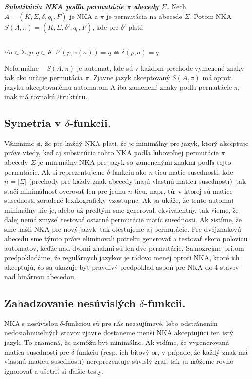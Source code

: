 \begin{defn}{\textbf {\textit {Substitúcia NKA podľa permutácie $\pi$ abecedy $\Sigma$.}}} Nech $A = (K,\Sigma,\delta,q_0,F)$ je NKA a $\pi$ je permutácia na abecede $\Sigma$. Potom NKA $S(A,\pi)=(K,\Sigma,\delta',q_0,F)$, kde pre $\delta'$ platí:
\\
\\
\centerline{$\forall a\in \Sigma, p,q \in K: \delta'(p,\pi(a)) = q \Longleftrightarrow \delta(p,a) = q$}
\end{defn}
Neformálne -- $S(A,\pi)$ je  automat, kde sú v každom prechode vymenené znaky tak ako určuje permutácia $\pi$. Zjavne jazyk akceptovaný $S(A,\pi)$ má oproti jazyku akceptovanému automatom A iba zamenené znaky podľa permutácie $\pi$, inak má rovnakú štruktúru.


\subsection{Symetria v $\delta$-funkcii.} Všimnime si, že pre každý NKA platí, že je minimálny pre jazyk, ktorý akceptuje práve vtedy, keď aj substitúcia tohto NKA podľa ľubovoľnej permutácie $\pi$ abecedy $\Sigma$ je minimálny NKA pre jazyk so zamenenými znakmi podľa tejto permutácie. Ak si reprezentujeme $\delta$-funkciu ako $n$-ticu matíc susednosti, kde $n=|\Sigma|$ (prechody pre každý znak abecedy majú vlastnú maticu susednosti), tak stačí minimálnosť overovať len pre jednu $n$-ticu, napr. tú, v ktorej sú matice susednosti zoradené lexikograficky vzostupne. Ak sa ukáže, že tento automat minimálny nie je, alebo už predtým sme generovali ekvivalentný, tak vieme, že ďalej nemá zmysel testovať ostatné permutácie matíc susednosti. Ak zistíme, že sme našli NKA pre nový jazyk, tak otestujeme aj permutácie. Pre dvojznakovú abecedu sme týmto práve eliminovali potrebu generovať a testovať skoro polovicu automatov, keďže nad dvomi znakmi sú len dve permutácie. Samozrejme pritom predpokladáme, že regulárnych jazykov je rádovo menej oproti NKA, ktoré ich akceptujú, čo sa ukazuje byť pravdivý predpoklad aspoň pre NKA do 4 stavov nad binárnou abecedou.


\subsection{Zahadzovanie nesúvislých $\delta$-funkcii.} NKA s nesúvislou $\delta$-funkciou sú pre nás nezaujímavé, lebo odstránením nedosiahnuteľných stavov zjavne dostaneme menší NKA akceptujúci ten istý jazyk. To znamená, že nemôžu byť minimálne. Ak vidíme, že vygenerovaná matica susednosti pre $\delta$-funkciu (resp. ich bitový or, v prípade, že každý znak má vlastnú maticu susednosti) nereprezentuje súvislý graf, tak ju môžeme rovno ignorovať a ušetriť si ďalšie testy.   



